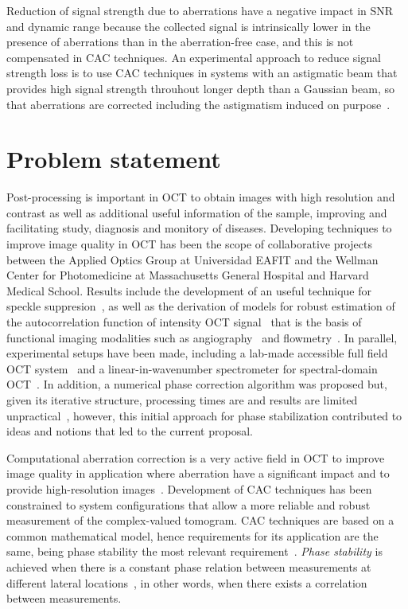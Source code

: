 Reduction of signal strength due to aberrations have a negative impact in SNR and dynamic range because the collected signal is intrinsically lower in the presence of aberrations than in the aberration-free case, and this is not compensated in CAC techniques. An experimental approach to reduce signal strength loss is to use CAC techniques in systems with an astigmatic beam that provides high signal strength throuhout longer depth than a Gaussian beam, so that aberrations are corrected including the astigmatism induced on purpose~\cite{Adie2012_Computational}.


\section{Problem statement}

Post-processing is important in OCT to obtain images with high resolution and contrast as well as additional useful information of the sample, improving and facilitating study, diagnosis and monitory of diseases. Developing techniques to improve image quality in OCT has been the scope of collaborative projects between the Applied Optics Group at Universidad EAFIT and the Wellman Center for Photomedicine at Massachusetts General Hospital and Harvard Medical School. Results include the development of an useful technique for speckle suppresion~\cite{Cuartas-Velez2018_Volumetric}, as well as the derivation of models for robust estimation of the autocorrelation function of intensity OCT signal~\cite{Uribe-Patarroyo2020_Noise} that is the basis of functional imaging modalities such as angiography~\cite{Wang2007_Three} and flowmetry~\cite{Liu2013_Quantitative}. In parallel, experimental setups have been made, including a lab-made accessible full field OCT system~\cite{Cuartas-Velez2019_Labmade} and a linear-in-wavenumber spectrometer for spectral-domain OCT~\cite{Ruiz-Lopera2018_Design}. In addition, a numerical phase correction algorithm was proposed but, given its iterative structure, processing times are and results are limited unpractical~\cite{Cuartas-Velez2017_Formacion}, however, this initial approach for phase stabilization contributed to ideas and notions that led to the current proposal.

Computational aberration correction is a very active field in OCT to improve image quality in application where aberration have a significant impact and to provide high-resolution images~\cite{Adie2012_Computational, Hillmann2016_Aberrationfree, Kumar2017_Invivo}. Development of CAC techniques has been constrained to system configurations that allow a more reliable and robust measurement of the complex-valued tomogram. CAC techniques are based on a common mathematical model, hence requirements for its application are the same, being phase stability the most relevant requirement~\cite{Shemonski2014_Stability}. \textit{Phase stability} is achieved when there is a constant phase relation between measurements at different lateral locations~\cite{Shemonski2014_Stability}, in other words, when there exists a correlation between measurements.

